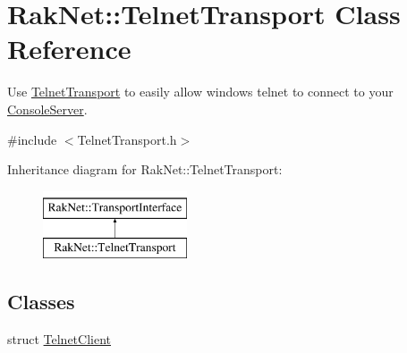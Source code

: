 \hypertarget{class_rak_net_1_1_telnet_transport}{\section{Rak\-Net\-:\-:Telnet\-Transport Class Reference}
\label{class_rak_net_1_1_telnet_transport}
}


Use \hyperlink{class_rak_net_1_1_telnet_transport}{Telnet\-Transport} to easily allow windows telnet to connect to your \hyperlink{class_rak_net_1_1_console_server}{Console\-Server}.  




{\ttfamily \#include $<$Telnet\-Transport.\-h$>$}

Inheritance diagram for Rak\-Net\-:\-:Telnet\-Transport\-:\begin{figure}[H]
\begin{center}
\leavevmode
\includegraphics[height=2.000000cm]{class_rak_net_1_1_telnet_transport}
\end{center}
\end{figure}
\subsection*{Classes}
\begin{DoxyCompactItemize}
\item 
struct \hyperlink{struct_rak_net_1_1_telnet_transport_1_1_telnet_client}{Telnet\-Client}
\end{DoxyCompactItemize}
